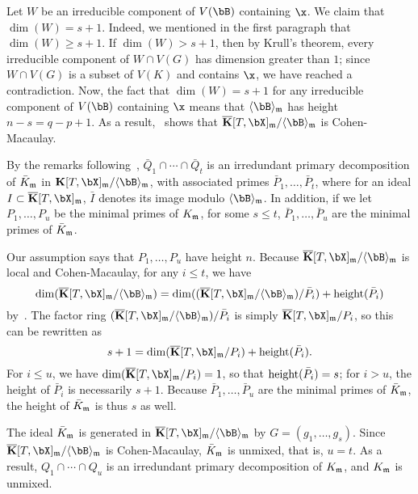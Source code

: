 \documentclass[12pt]{article}
\begin{document}
Let $W$ be an irreducible component of $V(\bB)$ containing $\x$.  We
claim that $\dim(W)=s+1$. Indeed, we mentioned in the first paragraph
that $\dim(W) \ge s+1$. If $\dim(W) > s+1$, then by Krull's theorem,
every irreducible component of $W \cap V(G)$ has dimension greater
than $1$; since $W \cap V(G)$ is a subset of $V(K)$ and contains $\x$,
we have reached a contradiction. Now, the fact that $\dim(W)=s+1$ for
any irreducible component of $V(\bB)$ containing $\x$ means that
$\langle \bB \rangle_\m$ has height $n-s=q-p+1$.  As a
result,~\cite[Theorem~18.18]{Eisenbud95} shows that
$\KKbar[T,\bX]_\m/\langle \bB \rangle_\m$ is Cohen-Macaulay.

By the remarks following~\cite[Theorem~IV.5.9]{ZaSa58}, $\bar Q_1 \cap
\cdots \cap \bar Q_t$ is an irredundant primary decomposition of $\bar
K_{\mathfrak{m}}$ in $\KK[T,\bX]_\m/\langle \bB \rangle_\m$, with associated
primes $\bar P_1,\dots,\bar P_t$, where for an ideal $I \subset
\KKbar[T,\bX]_\m$, $\bar I$ denotes its image modulo $\langle \bB
\rangle_\m$. In addition, if we let $P_1,\dots,P_u$ be the minimal
primes of $K_{\mathfrak{m}}$, for some $s \le t$, $\bar P_1,\dots,\bar P_u$ are
the minimal primes of $\bar K_{\mathfrak{m}}$.

Our assumption says that $P_1,\dots,P_u$ have height $n$. Because
$\KKbar[T,\bX]_\m/\langle \bB \rangle_\m$ is local and Cohen-Macaulay, for any
$i \le t$, we have 
$$\dim(\KKbar[T,\bX]_\m/\langle \bB \rangle_\m)=\dim((\KKbar[T,\bX]_\m/\langle \bB \rangle_\m) / \bar P_i) + {\rm height}(\bar P_i)$$
by~\cite[Theorem~17.4(i)]{Matsumura86}.
The factor ring $(\KKbar[T,\bX]_\m/\langle \bB \rangle_\m) / \bar P_i$ is simply
$\KKbar[T,\bX]_\m/P_i$, so this can be rewritten as
$$s+1 = \dim(\KKbar[T,\bX]_\m/P_i) + {\rm height}(\bar P_i).$$ For $i\le
u$, we have $\dim(\KKbar[T,\bX]_\m/P_i)=1$, so that ${\rm height}(\bar
P_i)=s$; for $i > u$, the height of $\bar P_i$ is necessarily
$s+1$. Because $\bar P_1,\dots,\bar P_u$ are the minimal primes of
$\bar K_{\mathfrak{m}}$, the height of $\bar K_{\mathfrak{m}}$ is thus $s$ as well.

The ideal $\bar K_{\mathfrak{m}}$ is generated in $\KKbar[T,\bX]_\m/\langle \bB
\rangle_\m$ by $G=(g_1,\dots,g_s)$. Since $\KKbar[T,\bX]_\m/\langle
\bB \rangle_\m$ is Cohen-Macaulay, $\bar K_{\mathfrak{m}}$ is unmixed, that is,
$u=t$.  As a result, $Q_1 \cap \cdots \cap Q_u$ is an irredundant
primary decomposition of $K_{\mathfrak{m}}$, and $K_{\mathfrak{m}}$ is unmixed.

\end{document}
